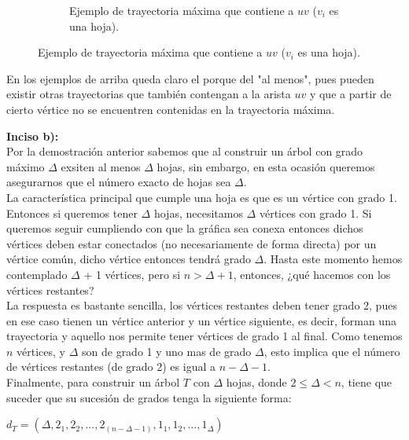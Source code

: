 \documentclass[12pt]{article}
\begin{document}
\begin{figure}[h!]
\begin{subfigure} {0.5\textwidth}
                    \caption{\scriptsize Ejemplo de trayectoria máxima que contiene a $uv$ ($v_i$ es una hoja).}
                \end{subfigure}
           
    \end{figure}
    En los ejemplos de arriba queda claro el porque del "al menos", pues pueden existir otras trayectorias  que también contengan a la arista $uv$ y que a partir de cierto vértice no se encuentren contenidas en la trayectoria máxima.
    
    
    \textbf{Inciso b):}\\
    
    Por la demostración anterior sabemos que al construir un árbol con grado máximo $\Delta$ exsiten al menos $\Delta$ hojas, sin embargo, en esta ocasión queremos asegurarnos que el número exacto de hojas sea $\Delta$.\\ 
    
    La característica principal que cumple una hoja es que es un vértice con grado 1. Entonces si queremos tener $\Delta$ hojas, necesitamos  $\Delta$ vértices con grado 1. Si queremos seguir cumpliendo con que la gráfica sea conexa entonces dichos vértices deben estar conectados (no necesariamente de forma directa) por un vértice común, dicho vértice entonces tendrá grado $\Delta$. Hasta este momento hemos contemplado $\Delta$ + 1 vértices, pero si $n > \Delta + 1$, entonces, ¿qué hacemos con los vértices restantes?\\
    
    La respuesta es bastante sencilla, los vértices restantes deben tener grado 2, pues en ese caso tienen un vértice anterior y un vértice siguiente, es decir, forman una trayectoria y aquello nos permite tener vértices de grado 1 al final. Como tenemos $n$ vértices, y $\Delta$ son de grado 1 y uno mas de grado $\Delta$, esto implica que el número de vértices restantes (de grado 2) es igual a $n - \Delta - 1$.\\
    
    Finalmente, para construir un árbol $T$ con $\Delta$ hojas, donde $2 \leq \Delta < n$, tiene que suceder que su sucesión de grados tenga la siguiente forma:
    \begin{center}
    $ d_T = (\Delta , 2_1 , 2_2 , ... , 2_{(n - \Delta - 1)} , 1_1 , 1_2 ,..., 1_\Delta)$\\
    \end{center}
    
\end{document}
